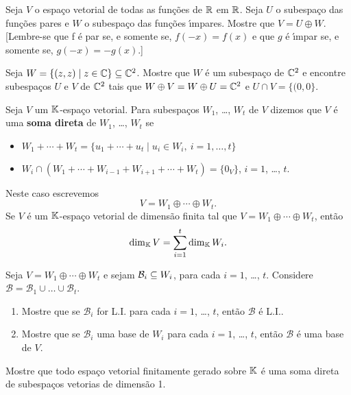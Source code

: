 \documentclass[12pt]{exam}
\begin{document}
\begin{exercicio}
  Seja $V$ o espa\c{c}o vetorial de todas as fun\c{c}\~oes de $\mathbb{R}$ em $\mathbb{R}$. Seja $U$ o subespa\c{c}o das fun\c{c}\~oes pares e $W$ o subespa\c{c}o das fun\c{c}\~oes {\'\i}mpares. Mostre que $V = U \oplus W$. [Lembre-se que f \'e par se, e somente se, $f(-x) = f(x)$ e que $g$ \'e {\'\i}mpar se, e somente se, $g(-x) = -g(x)$.]
\end{exercicio}

\begin{exercicio}
  Seja $W = \{(z,z) \mid z \in \mathbb{C}\} \subseteq \mathbb{C}^2$. Mostre que $W$ \'e um subespa\c{c}o de $\mathbb{C}^2$ e encontre subespa\c{c}os $U$ e $V$ de $\mathbb{C}^2$ tais que $W \oplus V = W \oplus U = \mathbb{C}^2$ e $U \cap V = \{(0,0\}$.
\end{exercicio}

Seja $V$ um $\mathbb{K}$-espa\c{c}o vetorial. Para subespa\c{c}os $W_1$, \dots, $W_t$ de $V$ dizemos que $V$ \'e uma \textbf{soma direta} de $W_1$, \dots, $W_t$ se
\begin{itemize}
  \item $W_1 + \cdots + W_t = \{u_1 + \cdots + u_t \mid u_i \in W_i,\ i = 1,\dots, t\}$
  \item $W_i \cap (W_1 + \cdots + W_{i - 1} + W_{i + 1} + \cdots + W_t) = \{0_V\}$, $i = 1$, \dots, $t$.
\end{itemize}
Neste caso escrevemos
\[
  V = W_1 \oplus \cdots \oplus W_t.
\]
Se $V$ \'e um $\mathbb{K}$-espa\c{c}o vetorial de dimens\~ao finita tal que $V = W_1 \oplus \cdots \oplus W_t$, ent\~ao
\[
  \dim_{\mathbb{K}}V = \sum_{i = 1}^t\dim_{\mathbb{K}}W_i.
\]

\begin{exercicio}
  Seja $V = W_1 \oplus \cdots \oplus W_t$ e sejam $\mathcal{B}_i \subseteq W_i$, para cada $i = 1$, \dots, $t$. Considere $\mathcal{B} = \mathcal{B}_1 \cup \dots \cup \mathcal{B}_t$.
  \begin{enumerate}[label=({\alph*})]
    \item Mostre que se $\mathcal{B}_i$ for L.I. para cada $i = 1$, \dots, $t$, ent\~ao $\mathcal{B}$ \'e L.I..
    \item Mostre que se $\mathcal{B}_i$ uma base de $W_i$ para cada $i = 1$, \dots, $t$, ent\~ao $\mathcal{B}$ \'e uma base de $V$.
  \end{enumerate}
\end{exercicio}

\begin{exercicio}
  Mostre que todo espa\c{c}o vetorial finitamente gerado sobre $\mathbb{K}$ \'e uma soma direta de subespa\c{c}os vetorias de dimens\~ao 1.
\end{exercicio}
\end{document}
